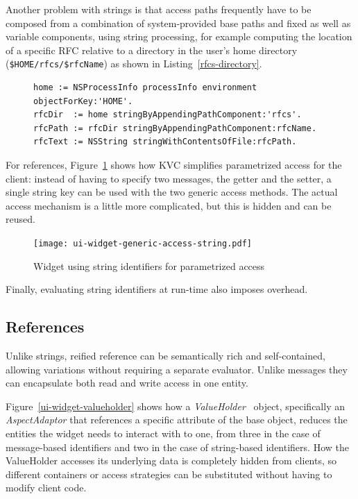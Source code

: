 \documentclass[preprint]{sigplanconf}
\begin{document}
Another problem with strings is that access paths frequently have to be composed from a combination of system-provided base paths
and fixed as well as variable components, using string processing, for example computing the location of a specific RFC relative
to a directory in the user's home directory  ({\tt \$HOME/rfcs/\$rfcName}) as shown in Listing~\ref{rfcs-directory}.

\begin{figure}[htbp]
\begin{lstlisting}[style=numbers,label=rfcs-directory,caption=Accessing a specific RFC in a directory relative to the user's \$HOME.]
home := NSProcessInfo processInfo environment objectForKey:'HOME'.
rfcDir  := home stringByAppendingPathComponent:'rfcs'.
rfcPath := rfcDir stringByAppendingPathComponent:rfcName.
rfcText := NSString stringWithContentsOfFile:rfcPath.
\end{lstlisting}
\end{figure}


For references, Figure~\ref{ui-widget-string-access} shows how KVC simplifies parametrized access for 
the client:  instead of having to specify two messages, the getter and the setter, a single string key can be used with
the two generic access methods.  The actual access mechanism is a little more complicated, but this is hidden and can 
be reused.

\begin{figure}[htbp]
\centering
\texttt{[image: ui-widget-generic-access-string.pdf]}
\caption{Widget using string identifiers for parametrized access}
\label{ui-widget-string-access}

\end{figure}

Finally, evaluating string identifiers at run-time also imposes overhead.

\subsection{References}


Unlike strings, reified reference can be semantically rich and self-contained, 
allowing variations without requiring a separate evaluator.
Unlike messages they can encapsulate both read and write access in one entity.  

Figure~\ref{ui-widget-valueholder} shows how a \emph{ValueHolder}~\cite{Woolf:1995:UUV:218662.218699} object,
specifically an {\em AspectAdaptor} that
references a specific attribute of the base object, reduces the entities the widget
needs to interact with to one, from three in the case of message-based identifiers and two
in the case of string-based identifiers.  How the ValueHolder accesses 
its underlying data is completely hidden from clients, so different containers or access
strategies can be substituted without having to modify client code.
\end{document}

